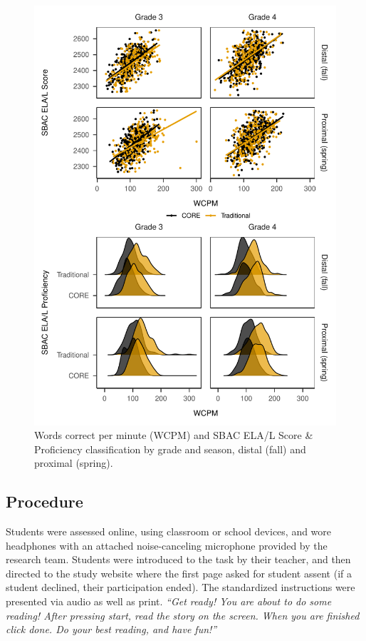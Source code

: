\documentclass[
  english,
  man, fleqn, noextraspace]{apa6}
\begin{document}
\begin{figure}
\centering
\includegraphics{demo_files/figure-latex/fig-sbac-scatter-1.pdf}
\caption{\label{fig:fig-sbac-scatter}Words correct per minute (WCPM) and SBAC ELA/L Score \& Proficiency classification by grade and season, distal (fall) and proximal (spring).}
\end{figure}

\hypertarget{procedure}{%
\subsection{Procedure}\label{procedure}}

Students were assessed online, using classroom or school devices, and wore headphones with an attached noise-canceling microphone provided by the research team. Students were introduced to the task by their teacher, and then directed to the study website where the first page asked for student assent (if a student declined, their participation ended). The standardized instructions were presented via audio as well as print. \emph{\enquote{Get ready! You are about to do some reading! After pressing start, read the story on the screen. When you are finished click done. Do your best reading, and have fun!}}
\end{document}
